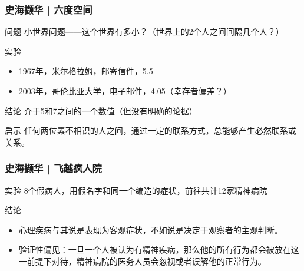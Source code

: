 \begin{frame}
  \frametitle{史海撷华 | 六度空间}
  \begin{block}{问题}
    小世界问题——这个世界有多小？（世界上的2个人之间间隔几个人？）
  \end{block}
  \pause
  \begin{block}{实验}
    \begin{itemize}
      \item 1967年，米尔格拉姆，邮寄信件，5.5
      \item 2003年，哥伦比亚大学，电子邮件，4.05（幸存者偏差？）
    \end{itemize}
  \end{block}
  \pause
  \begin{block}{结论}
    介于5和7之间的一个数值（但没有明确的论据）
  \end{block}
  \pause
  \begin{block}{启示}
    任何两位素不相识的人之间，通过一定的联系方式，总能够产生必然联系或关系。
  \end{block}
\end{frame}

\begin{frame}
  \frametitle{史海撷华 | 飞越疯人院}
  \begin{block}{实验}
    8个假病人，用假名字和同一个编造的症状，前往共计12家精神病院
  \end{block}
  \pause
  \begin{block}{结论}
    \begin{itemize}
      \item 心理疾病与其说是表现为客观症状，不如说是决定于观察者的主观判断。
      \item 验证性偏见：一旦一个人被认为有精神疾病，那么他的所有行为都会被放在这一前提下对待，精神病院的医务人员会忽视或者误解他的正常行为。
    \end{itemize}
  \end{block}
\end{frame}


